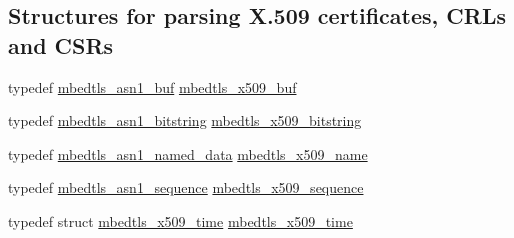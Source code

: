 \subsection*{Structures for parsing X.509 certificates, C\-R\-Ls and C\-S\-Rs}
\begin{DoxyCompactItemize}
\item 
typedef \hyperlink{structmbedtls__asn1__buf}{mbedtls\-\_\-asn1\-\_\-buf} \hyperlink{group__x509__module_ga4d02c9e8e4e2934555e0d132cd2976dc}{mbedtls\-\_\-x509\-\_\-buf}
\item 
typedef \hyperlink{structmbedtls__asn1__bitstring}{mbedtls\-\_\-asn1\-\_\-bitstring} \hyperlink{group__x509__module_gaf25a97602f25027e160f22f6d5590636}{mbedtls\-\_\-x509\-\_\-bitstring}
\item 
typedef \hyperlink{structmbedtls__asn1__named__data}{mbedtls\-\_\-asn1\-\_\-named\-\_\-data} \hyperlink{group__x509__module_ga2272228c7776102328df31623af3168c}{mbedtls\-\_\-x509\-\_\-name}
\item 
typedef \hyperlink{structmbedtls__asn1__sequence}{mbedtls\-\_\-asn1\-\_\-sequence} \hyperlink{group__x509__module_gabd52d60a09315854d9ef849d02154f35}{mbedtls\-\_\-x509\-\_\-sequence}
\item 
typedef struct \hyperlink{structmbedtls__x509__time}{mbedtls\-\_\-x509\-\_\-time} \hyperlink{group__x509__module_ga38827540a02fb2ddca08ec0917a8a41b}{mbedtls\-\_\-x509\-\_\-time}
\end{DoxyCompactItemize}
